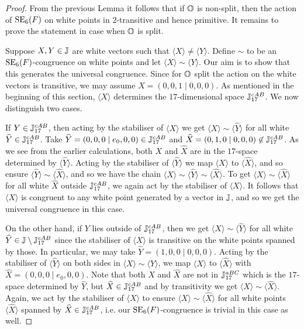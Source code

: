 \begin{proof}
	From the previous Lemma it follows that if $\mathbb{O}$ is non-split, then the action of 
	$\mathrm{SE}_6(F)$ on white points in $2$-transitive and hence primitive. It remains to prove
	the statement in case when $\mathbb{O}$ is split.

	Suppose $X,Y \in \mathbb{J}$ are white vectors such that $\langle X \rangle \neq
	\langle Y \rangle$. Define $\sim$ to be an \mbox{$\mathrm{SE}_6(F)$-congruence} on white points and
	let $\langle X\rangle \sim \langle Y\rangle$. Our aim is to show that this generates 
	the universal congruence. 
	Since for $\mathbb{O}$ split the action on the white vectors is transitive, we may assume
	$X = (0,0,1 \mid 0,0,0)$. As mentioned in the beginning of this section, 
	$\langle X\rangle$ 
	determines the $17$-dimensional space $\mathbb{J}_{17}^{cAB}$. We now distinguish
	two cases.
	
	If $Y \in \mathbb{J}_{17}^{cAB}$, then acting by the stabiliser of $\langle X\rangle$ 
	we get $\langle X\rangle \sim \langle \hat{Y}\rangle $ for all white 
	$\widehat{Y} \in \mathbb{J}_{17}^{cAB}$. Take
	$\widehat{Y} = (0,0,0\mid e_0,0,0) \in \mathbb{J}_{17}^{cAB}$ and 
	\mbox{$\widehat{X} = (0,1,0\mid 0,0,0)
	\not\in \mathbb{J}_{17}^{cAB}$}. As we see from the earlier calculations, both
	$X$ and $\hat{X}$ are in the $17$-space determined by $\langle \hat{Y} \rangle$. 
	Acting by the
	stabiliser of $\langle \hat{Y}\rangle$ 
	we map $\langle X\rangle $ to $\langle \hat{X} \rangle $,
	and so ensure $\langle \hat{Y} \rangle \sim \langle \hat{X} \rangle$,
	and so we have the chain $\langle X\rangle \sim \langle\hat{Y}\rangle \sim 
	\langle\hat{X}\rangle$. To get $\langle X\rangle \sim \langle\hat{X}\rangle$ for 
	all white $\hat{X}$ outside $\mathbb{J}_{17}^{cAB}$, we again act by the stabiliser of $\langle
	X\rangle$.
	It follows that $\langle X \rangle$ is congruent to any white point generated by a 
	vector in $\mathbb{J}$, and so we get the universal congruence in this case.
	
	On the other hand, if $Y$ lies outside of $\mathbb{J}_{17}^{cAB}$, then we get $\langle X
	\rangle\sim \langle\hat{Y}\rangle$
	for all white $\widehat{Y} \in \mathbb{J}\setminus \mathbb{J}_{17}^{cAB}$ since the stabiliser of 
	$\langle X\rangle$ is transitive on the white points spanned by those. 
	In particular, we may take $\hat{Y} = (1,0,0\mid 0,0,0)$.
	Acting by the stabiliser of $\langle\hat{Y}\rangle$ on both sides in 
	$\langle X\rangle \sim \langle\hat{Y}\rangle$, we map 
	$\langle X\rangle$ to $\langle \hat{X}\rangle$ with $\hat{X} = (0,0,0\mid e_0,0,0)$.
	Note that both $X$ and $\hat{X}$ are not 
	in $\mathbb{J}_{17}^{aBC}$ which is the $17$-space determined by $\hat{Y}$, but 
	$\widehat{X} \in \mathbb{J}_{17}^{cAB}$ and by transitivity we get $\langle X\rangle 
	\sim \langle \hat{X} \rangle$. Again,
	we act by the stabiliser of $\langle X\rangle $ to ensure $\langle X\rangle  \sim
	\langle \hat{X} \rangle$ for all white points $\langle \hat{X} \rangle$ spanned by 
	$\widehat{X} \in \mathbb{J}_{17}^{cAB}$, i.e. our $\mathrm{SE}_6(F)$-congruence is trivial in this case 
	as well.
\end{proof}

